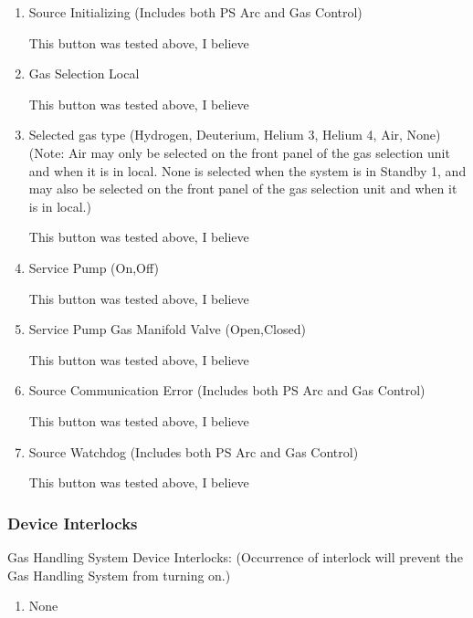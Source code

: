 \documentclass[11pt]{book}		%
\begin{document}
\begin{enumerate}
 \item Source Initializing (Includes both PS Arc and Gas Control)

\color{red}
This button was tested above, I believe
\color{black}

 \item Gas Selection Local

\color{red}
This button was tested above, I believe
\color{black}

 \item Selected gas type (Hydrogen, Deuterium, Helium 3, Helium 4, Air, None) (Note: Air may only be selected on the front panel of the gas selection unit and when it is in local.  None is selected when the system is in Standby 1, and may also be selected on the front panel of the gas selection unit and when it is in local.)

\color{red}
This button was tested above, I believe
\color{black}

 \item Service Pump (On,Off)

\color{red}
This button was tested above, I believe
\color{black}

 \item Service Pump Gas Manifold Valve (Open,Closed)

\color{red}
This button was tested above, I believe
\color{black}

 \item Source Communication Error (Includes both PS Arc and Gas Control)

\color{red}
This button was tested above, I believe
\color{black}

 \item Source Watchdog (Includes both PS Arc and Gas Control)

\color{red}
This button was tested above, I believe
\color{black}

\end{enumerate}

\subsubsection{Device Interlocks}

Gas Handling System Device Interlocks:
(Occurrence of interlock will prevent the Gas Handling System from turning on.)

\begin{enumerate}
\item None
\end{enumerate}
\end{document}
